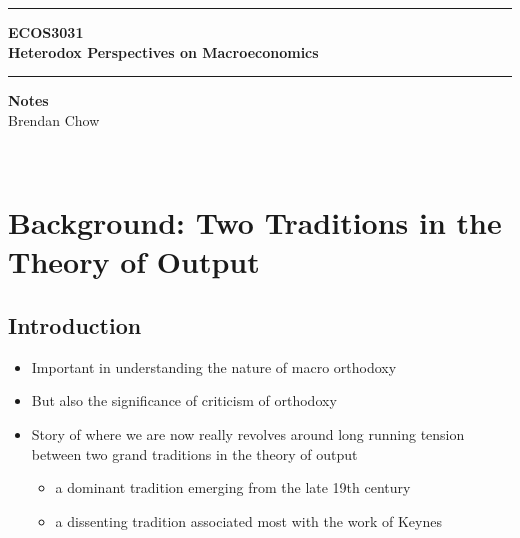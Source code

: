 \documentclass[a4paper,twoside]{article}
\numberwithin{equation}{section}
\numberwithin{figure}{section}
\begin{document}
\begin{titlepage}
	\centering
	\vspace*{4.5cm}
	\rule{\linewidth}{2pt}
	\LARGE\textbf{ECOS3031}\\
	\vspace{0.5cm}
	\Huge\textbf{Heterodox Perspectives on Macroeconomics}\\
	\rule{\linewidth}{2pt}
	\LARGE\textbf{Notes}\\
	\vspace{1.5cm}
	\Large Brendan Chow
	\vfill
\end{titlepage}
\newpage
\
\newpage
\tableofcontents
\newpage
\
\newpage
{}
\section{Background: Two Traditions in the Theory of Output}
\subsection{Introduction}
	\begin{itemize}
		\item Important in understanding the nature of macro orthodoxy
		\item But also the significance of criticism of orthodoxy
		\item Story of where we are now really revolves around long running tension between two grand traditions in the theory of output
		\begin{itemize}
			\item a dominant tradition emerging from the late 19th century
			\item a dissenting tradition associated most with the work of Keynes
		\end{itemize}
	\end{itemize}
\end{document}
